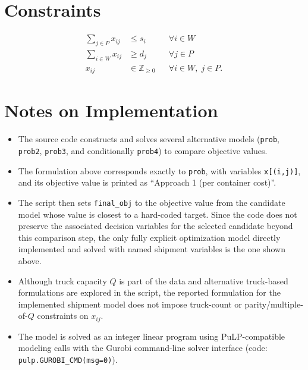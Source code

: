 \section*{Constraints}

\begin{align}
\sum_{j \in P} x_{ij} &\le s_i && \forall i \in W
\label{con:supply}
\\
\sum_{i \in W} x_{ij} &\ge d_j && \forall j \in P
\label{con:demand}
\\
x_{ij} &\in \mathbb{Z}_{\ge 0} && \forall i \in W,\; j \in P.
\label{con:integrality}
\end{align}

\section*{Notes on Implementation}

\begin{itemize}
    \item The source code constructs and solves several alternative models (\texttt{prob}, \texttt{prob2}, \texttt{prob3}, and conditionally \texttt{prob4}) to compare objective values.
    \item The formulation above corresponds exactly to \texttt{prob}, with variables \texttt{x[(i,j)]}, and its objective value is printed as ``Approach 1 (per container cost)''.
    \item The script then sets \texttt{final\_obj} to the objective value from the candidate model whose value is closest to a hard-coded target. Since the code does not preserve the associated decision variables for the selected candidate beyond this comparison step, the only fully explicit optimization model directly implemented and solved with named shipment variables is the one shown above.
    \item Although truck capacity $Q$ is part of the data and alternative truck-based formulations are explored in the script, the reported formulation for the implemented shipment model does not impose truck-count or parity/multiple-of-$Q$ constraints on $x_{ij}$.
    \item The model is solved as an integer linear program using PuLP-compatible modeling calls with the Gurobi command-line solver interface (code: \texttt{pulp.GUROBI\_CMD(msg=0)}).
\end{itemize}
